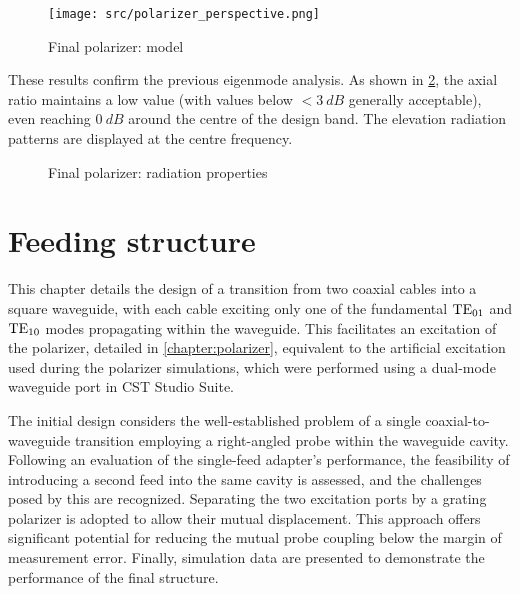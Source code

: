 \documentclass[11pt,a4paper,twoside,openany]{report}
\begin{document}
\begin{figure}[!ht]
    \centering
    \texttt{[image: src/polarizer\_perspective.png]}
    \caption{\label{fig:polarizer-perspective}Final polarizer: model}
\end{figure}

These results confirm the previous eigenmode analysis. As shown in \cref{fig:polarizer-radiation}, the axial ratio maintains a low value (with values below $<\qty{3}{dB}$ generally acceptable), even reaching $\qty{0}{dB}$ around the centre of the design band. The elevation radiation patterns are displayed at the centre frequency.

\begin{figure}[!ht]
    \centering
    
    \caption{\label{fig:polarizer-radiation}Final polarizer: radiation properties}
\end{figure}

\chapter{Feeding structure}
\label{chapter:feeding-structure}
This chapter details the design of a transition from two coaxial cables into a square waveguide, with each cable exciting only one of the fundamental $\text{TE}_{01}$ and $\text{TE}_{10}$ modes propagating within the waveguide. This facilitates an excitation of the polarizer, detailed in \cref{chapter:polarizer}, equivalent to the artificial excitation used during the polarizer simulations, which were performed using a dual-mode waveguide port in CST Studio Suite.

The initial design considers the well-established problem of a single coaxial-to-waveguide transition employing a right-angled probe within the waveguide cavity. Following an evaluation of the single-feed adapter's performance, the feasibility of introducing a second feed into the same cavity is assessed, and the challenges posed by this are recognized. Separating the two excitation ports by a grating polarizer is adopted to allow their mutual displacement. This approach offers significant potential for reducing the mutual probe coupling below the margin of measurement error. Finally, simulation data are presented to demonstrate the performance of the final structure.
\end{document}
